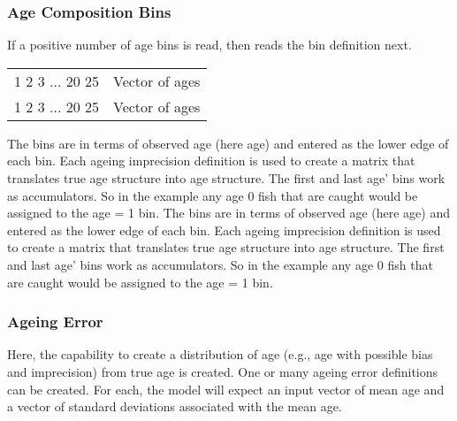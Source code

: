 \subsubsection{Age Composition Bins}
If a positive number of age bins is read, then reads the bin definition next.
\begin{center}
	\vspace*{-\baselineskip}
	\vspace*{-\baselineskip}
	\begin{tabular}{p{3cm} p{13cm}}
		\hline
		1 2 3 ... 20 25 & Vector of ages \Tstrut\Bstrut\\
		1 2 3 ... 20 25 & Vector of ages \Tstrut\Bstrut\\
		\hline		
	\end{tabular}
\end{center}
The bins are in terms of observed age (here age) and entered as the lower edge of each bin. Each ageing imprecision definition is used to create a matrix that translates true age structure into age structure. The first and last age' bins work as accumulators. So in the example any age 0 fish that are caught would be assigned to the age = 1 bin.
The bins are in terms of observed age (here age) and entered as the lower edge of each bin. Each ageing imprecision definition is used to create a matrix that translates true age structure into age structure. The first and last age' bins work as accumulators. So in the example any age 0 fish that are caught would be assigned to the age = 1 bin.

\subsubsection{Ageing Error}
Here, the capability to create a distribution of age (e.g., age with possible bias and imprecision) from true age is created. One or many ageing error definitions can be created. For each, the model will expect an input vector of mean age and a vector of standard deviations associated with the mean age. 

